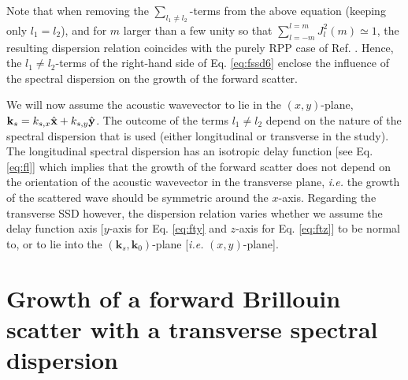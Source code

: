 \documentclass[
 reprint,
 amsmath,amssymb,
 aps,
]{revtex4-1}
\begin{document}
\begin{widetext}
Note that when removing the $\sum_{l_1\neq l_2}$-terms from the above equation (keeping only $l_1=l_2$), and for $m$ larger than a few unity so that $\sum_{l=-m}^{l=m}J_l^2(m) \simeq 1$, the resulting dispersion relation coincides with the purely RPP case of Ref. \cite[]{Ruyer_FSBS}. Hence, the $l_1\neq l_2$-terms of the right-hand side of Eq. \eqref{eq:fssd6} enclose the influence of the spectral dispersion on the growth of the forward scatter. 

We will now assume the acoustic wavevector to lie in the $(x,y)$-plane, $\mathbf{k}_s = k_{s,x}\Hat{\mathbf{x}} +k_{s,y}\Hat{\mathbf{y}}$.
The outcome of the  terms $l_1\neq l_2$ depend on the nature of the spectral dispersion that is used (either longitudinal or transverse in the study). The longitudinal spectral dispersion has  an isotropic  delay function [see Eq. \eqref{eq:fl}] which implies that the growth of the forward scatter does not depend on the orientation of the acoustic wavevector in the transverse plane, \emph{i.e.} the growth of the scattered wave should be symmetric around the $x$-axis.  
Regarding the transverse SSD however, the dispersion relation varies whether we assume the  delay function axis [$y$-axis for  Eq. \eqref{eq:fty} and $z$-axis for  Eq. \eqref{eq:ftz}] to be normal to, or to lie into the $(\mathbf{k}_s,\mathbf{k}_0)$-plane [\emph{i.e.} $(x,y)$-plane].  

\section{Growth of a forward Brillouin scatter with a transverse spectral dispersion}

\end{widetext}
\end{document}
